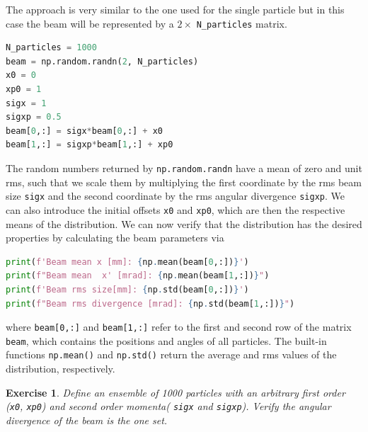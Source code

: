 \documentclass{article}
\newtheorem{exercise}{Exercise}
\begin{document}
The approach is very similar to the one used for the single particle but in this case the beam will be represented by a $ 2\times$ {\tt N\_particles} matrix.
\begin{lstlisting}[language=Python]
N_particles = 1000
beam = np.random.randn(2, N_particles)
x0 = 0
xp0 = 1
sigx = 1 
sigxp = 0.5 
beam[0,:] = sigx*beam[0,:] + x0
beam[1,:] = sigxp*beam[1,:] + xp0
\end{lstlisting}
The random numbers returned by \texttt{np.random.randn} have a mean of zero and unit rms, such that we scale them by multiplying
the first coordinate by the rms beam size {\tt sigx} and the second coordinate by the rms 
angular divergence {\tt sigxp}.
We can also introduce the initial offsets {\tt x0} and {\tt xp0}, which are then the 
respective means of the distribution. We can now verify that the distribution has the 
desired properties by calculating the beam parameters via
\begin{lstlisting}[language=Python]
print(f'Beam mean x [mm]: {np.mean(beam[0,:])}')
print(f"Beam mean  x' [mrad]: {np.mean(beam[1,:])}")
print(f'Beam rms size[mm]: {np.std(beam[0,:])}')
print(f"Beam rms divergence [mrad]: {np.std(beam[1,:])}")
\end{lstlisting}
where {\tt beam[0,:]} and  {\tt beam[1,:]} refer to the first and second row of the matrix {\tt beam}, which 
contains the positions and angles of all particles. The built-in functions {\tt np.mean()} and 
{\tt np.std()} return the average and rms values of the distribution, respectively.
\begin{exercise}
Define an ensemble of 1000 particles with an arbitrary first order ({\tt x0}, {\tt xp0}) and second order momenta( {\tt sigx} and {\tt sigxp}).
Verify the angular divergence of the beam is the one set.
\end{exercise}
\end{document}
